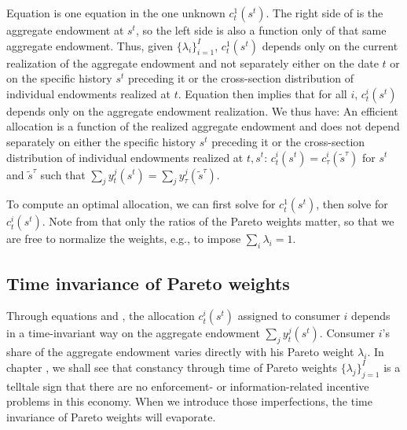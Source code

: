 Equation  is one equation in the one unknown  $c_t^1(s^t)$. The right
side of  is the  aggregate endowment at $s^t$, so the
left side is  also a function only of that same aggregate endowment. Thus, given $\{\lambda_i\}_{i=1}^I$,
$c_t^1(s^t)$ depends only on the current realization of the
aggregate endowment and not separately  either on  the date $t$ or on the specific history $s^t$
preceding it  or  the cross-section distribution of individual
endowments realized at $t$. Equation  then implies that for all $i$,
$c_t^i(s^t)$ depends only on the aggregate endowment realization.
We thus have:
\medskip
{} An efficient allocation is a function of
the realized aggregate endowment and  does not depend separately  on either the specific history $s^t$
preceding it or  the cross-section distribution of individual
endowments realized at $t, s^t$: $c_t^i(s^t)=c_\tau^i(\tilde
s^{\tau})$ for $s^t$ and $\tilde s^{\tau}$ such that $\sum_j
y_t^j(s^t) = \sum_j y_\tau^j(\tilde s^{\tau})$.
\medskip

 To compute an optimal allocation, we can first solve  
for $c_t^1(s^t)$, then solve  for $c_t^i(s^t)$.
Note  from  that only the ratios of the Pareto weights matter,
so that we are free to normalize the weights, e.g., to impose
$\sum_i \lambda_i=1$.



\subsection{Time invariance of Pareto weights}
  Through  equations  and ,
the allocation $c_t^i(s^t)$ assigned to consumer $i$
depends in a time-invariant way on the aggregate endowment
$\sum_j y_t^j(s^t)$.  Consumer $i$'s share of the aggregate endowment varies
directly with his Pareto weight $\lambda_i$.   In chapter
, we shall see that  constancy through
time of Pareto weights
 $\{\lambda_j\}_{j=1}^I$ is a telltale sign that there are no
enforcement- or information-related  incentive problems
in this economy. %
When we introduce  those imperfections, the time invariance of  Pareto
weights will evaporate.
%


